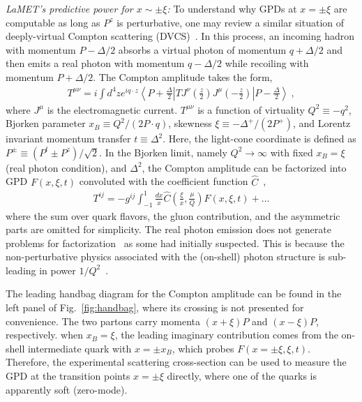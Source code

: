 \documentclass[prl,aps,twocolumn,preprintnumbers, showpacs, nofootinbib,superscriptaddress,notitlepage]{revtex4-1}
\begin{document}
\vspace{0.1in}
\textit{LaMET's predictive power for $x \sim \pm \xi$:}
To understand why GPDs at $ x=\pm \xi$ are computable as long as $P^z$ is perturbative, one may review a similar situation of deeply-virtual Compton scattering (DVCS)~\cite{Ji:1996ek,Ji:1996nm}. In this process, an incoming hadron with momentum $P-\Delta/2$ absorbs a virtual photon of momentum $q+\Delta/2$ and then emits a real photon with momentum $q-\Delta/2$ while recoiling with momentum $P+\Delta/2$. The Compton amplitude takes the form,
\begin{align}
T^{\mu \nu} = i \int d^4 z e^{i q \cdot z}\left\langle P+\frac{\Delta}{2}\right| T J^\nu\left(\frac{z}{2}\right) J^\mu\left(-\frac{z}{2}\right)\left|P-\frac{\Delta}{2}\right\rangle  \ ,
\end{align}
where $J^{\mu}$ is the electromagnetic current. $T^{\mu\nu}$ is a function of virtuality $Q^2 \equiv -q^2$, Bjorken parameter $x_B \equiv Q^2/(2P\cdot q)$, skewness $\xi \equiv -\Delta^{+}/(2P^{+})$, and Lorentz invariant momentum transfer $t \equiv \Delta^2$. Here, the light-cone coordinate is defined as $P^{\pm} \equiv (P^t \pm P^z)/\sqrt{2}$. In the Bjorken limit, namely $Q^2 \rightarrow \infty$ with fixed $x_B=\xi$ (real photon condition), and $\Delta^2$, the Compton amplitude can be factorized into GPD $ F(x,\xi,t)$ convoluted with the coefficient function $\hat{C}$~\cite{Ji:1998xh}, %
\begin{align}\label{eq:DVCSfac}
T^{ij} = -g^{ij} \int_{-1}^{1} \frac{dx}{x} \hat{C}\left(\frac{\xi}{x},\frac{\mu}{Q}\right) F(x,\xi,t) + ...
\end{align}
where the sum over quark flavors, the gluon contribution, and the asymmetric parts are omitted for simplicity.  The real photon emission does not generate problems for factorization~\cite{Ji:1998xh,Collins:1998be,Radyushkin:1997ki} as some had initially suspected. This is because the non-perturbative physics associated with the (on-shell) photon structure is sub-leading in power $1/Q^2$~\cite{Ji:1998xh}. 

 The leading handbag diagram for the Compton amplitude can be found in the left panel of Fig.~\ref{fig:handbag}, where its crossing is not presented for convenience.  The two partons carry momenta $(x+\xi)P$ and $(x-\xi)P$, respectively. when $x_B = \xi$, the leading imaginary contribution comes from the on-shell intermediate quark with $x = \pm x_B$, which probes $F(x=\pm\xi, \xi, t)$. Therefore, the experimental scattering cross-section can be used to measure the GPD at the transition points $x = \pm \xi$ directly, where one of the quarks is apparently soft (zero-mode). 
\end{document}
